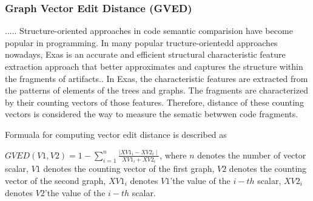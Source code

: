\subsubsection{\textbf{Graph Vector Edit Distance (GVED)}} 
.....
Structure-oriented approaches in code semantic comparision have become popular in programming. In many popular tructure-orientedd approaches nowadays, Exas is an accurate and efficient structural characteristic feature extraction approach that better approximates and captures the structure within the fragments of artifacts.\cite{Accurate and Efficient Structural Characteristic Feature Extraction for Clone Detection}.
 In Exas, the characteristic features are extracted from the patterns of elements of the trees and graphs. The fragments are characterized by their counting vectors of those features. Therefore, distance of these counting vectors is considered the way to measure the sematic betwwen code fragments.

Formuala for computing vector edit distance is described as

$GVED(V1, V2) = 1 - \sum_{i=1}^{n} \frac{ \mid XV1_i - XV2_i \mid}{XV1_i + XV2_i}$, 
where $n$ denotes the number of vector scalar, $V1$ denotes the counting vector of the first graph, $V2$ denotes the counting vector of the second graph, $XV1_i$ denotes $V1$\rq the value of the $i-th$ scalar, $XV2_i$ denotes $V2$\rq the value of the $i-th$ scalar.  